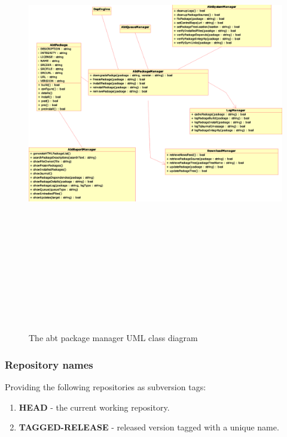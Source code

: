 \begin{figure}
	\centering
	\includegraphics[width=15cm,height=20cm]{umlDesign.eps}
	\caption{The abt package manager UML class diagram}
	\label{fig:abtapi}
\end{figure}



\subsubsection{Repository names}
Providing the following repositories as subversion tags:

\begin{enumerate}
  \item \textbf{HEAD} - the current working repository.
  \item \textbf{TAGGED-RELEASE} - released version tagged with a unique name.
\end{enumerate}

